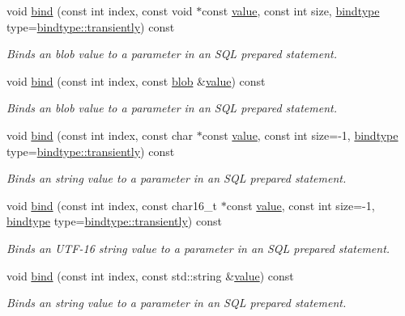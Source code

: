 \begin{DoxyCompactItemize}
void \hyperlink{a00013_a784339d393006f4ea67bc7004d280106}{bind} (const int index, const void $\ast$const \hyperlink{a00015}{value}, const int size, \hyperlink{a00038_ae6a0fc429d821cca9a1b01d36cb0991d}{bindtype} type=\hyperlink{a00038_ae6a0fc429d821cca9a1b01d36cb0991dad51ecd4c7c8454ddc870989523c01d4b}{bindtype\-::transiently}) const 
\begin{DoxyCompactList}\small\item\em Binds an blob value to a parameter in an S\-Q\-L prepared statement. \end{DoxyCompactList}\item 
void \hyperlink{a00013_aaaa1ec53616b974e0dce72f3ba88b20f}{bind} (const int index, const \hyperlink{a00002}{blob} \&\hyperlink{a00015}{value}) const 
\begin{DoxyCompactList}\small\item\em Binds an blob value to a parameter in an S\-Q\-L prepared statement. \end{DoxyCompactList}\item 
void \hyperlink{a00013_aa6dd611fd47f53459006393b378b0536}{bind} (const int index, const char $\ast$const \hyperlink{a00015}{value}, const int size=-\/1, \hyperlink{a00038_ae6a0fc429d821cca9a1b01d36cb0991d}{bindtype} type=\hyperlink{a00038_ae6a0fc429d821cca9a1b01d36cb0991dad51ecd4c7c8454ddc870989523c01d4b}{bindtype\-::transiently}) const 
\begin{DoxyCompactList}\small\item\em Binds an string value to a parameter in an S\-Q\-L prepared statement. \end{DoxyCompactList}\item 
void \hyperlink{a00013_ab05bdb6e6f4a096a002b41f22ff1c5ae}{bind} (const int index, const char16\-\_\-t $\ast$const \hyperlink{a00015}{value}, const int size=-\/1, \hyperlink{a00038_ae6a0fc429d821cca9a1b01d36cb0991d}{bindtype} type=\hyperlink{a00038_ae6a0fc429d821cca9a1b01d36cb0991dad51ecd4c7c8454ddc870989523c01d4b}{bindtype\-::transiently}) const 
\begin{DoxyCompactList}\small\item\em Binds an U\-T\-F-\/16 string value to a parameter in an S\-Q\-L prepared statement. \end{DoxyCompactList}\item 
void \hyperlink{a00013_a8aa321913ed5bf9398d0694f4a222c15}{bind} (const int index, const std\-::string \&\hyperlink{a00015}{value}) const 
\begin{DoxyCompactList}\small\item\em Binds an string value to a parameter in an S\-Q\-L prepared statement. \end{DoxyCompactList}\item 

\end{DoxyCompactItemize}
